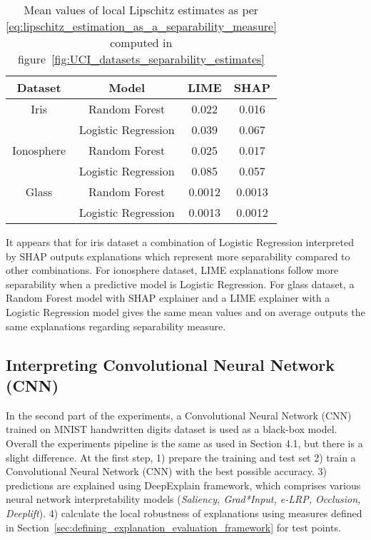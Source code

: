 \documentclass[english]{tktltiki2}
\theoremstyle{definition}
\theoremstyle{remark}
\begin{document}
\begin{table}[H]
	\caption{Mean values of local Lipschitz estimates as per \eqref{eq:lipschitz_estimation_as_a_separability_measure} computed in figure~\ref{fig:UCI_datasets_separability_estimates}}
	\label{table:lipschitz_estimation_separability_aggregated_datasets_UCI}
	\begin{center}
		\begin{tabular}{|c|c|c|c|}
			\hline
			\textbf{Dataset} & \textbf{Model} & \textbf{LIME} & \textbf{SHAP} \\ \hline
			
			Iris & Random Forest & 0.022 & 0.016  \\ \hline
			& Logistic Regression & 0.039 & 0.067 \\ \hline
			
			Ionosphere & Random Forest & 0.025 & 0.017 \\ \hline
			& Logistic Regression & 0.085 & 0.057 \\ \hline
			
			Glass & Random Forest & 0.0012 & 0.0013 \\ \hline
			& Logistic Regression & 0.0013 & 0.0012 \\ \hline
			
		\end{tabular}
	\end{center}
\end{table}

It appears that for iris dataset a combination of Logistic Regression interpreted by SHAP outputs explanations which represent more separability compared to other combinations. For ionosphere dataset, LIME explanations follow more separability when a predictive model is Logistic Regression. For glass dataset, a Random Forest model with SHAP explainer and a LIME explainer with a Logistic Regression model gives the same mean values and on average outputs the same explanations regarding separability measure.


\subsection{Interpreting Convolutional Neural Network (CNN)}\label{sec:interpret_convolutional_neural_network}
In the second part of the experiments, a Convolutional Neural Network (CNN) trained on MNIST handwritten digits dataset is used as a black-box model. Overall the experiments pipeline is the same as used in Section 4.1, but there is a slight difference. At the first step, 1) prepare the training and test set 2) train a Convolutional Neural Network (CNN) with the best possible accuracy. 3) predictions are explained using DeepExplain framework, which comprises various neural network interpretability models (\textit{Saliency, Grad*Input, e-LRP, Occlusion, Deeplift}). 4) calculate the local robustness of explanations using measures defined in Section~\ref{sec:defining_explanation_evaluation_framework} for test points. 
\end{document}
